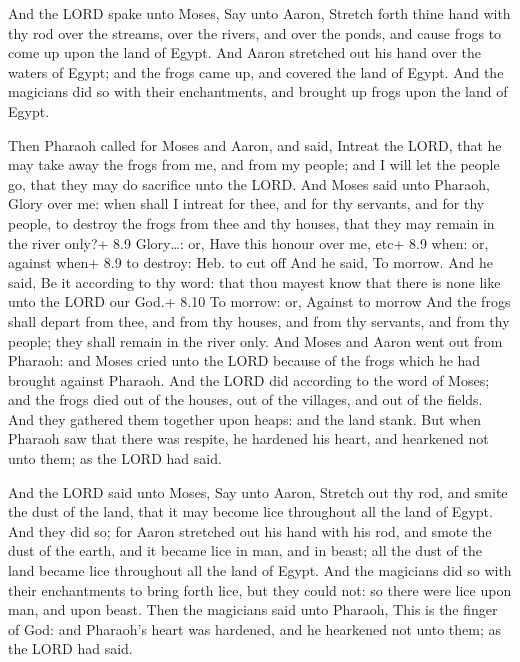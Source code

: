  And the LORD spake unto Moses, Say unto Aaron, Stretch
forth thine hand with thy rod over the streams, over the rivers, and
over the ponds, and cause frogs to come up upon the land of Egypt.
 And Aaron stretched out his hand over the waters of Egypt;
and the frogs came up, and covered the land of Egypt.  And
the magicians did so with their enchantments, and brought up frogs upon
the land of Egypt.

 Then Pharaoh called for Moses and Aaron, and said,
Intreat the LORD, that he may take away the frogs from me, and from my
people; and I will let the people go, that they may do sacrifice unto
the LORD.  And Moses said unto Pharaoh, Glory over me: when
shall I intreat for thee, and for thy servants, and for thy people, to
destroy the frogs from thee and thy houses, that they may remain in the
river only?+ 8.9 Glory\ldots: or, Have this honour over me, etc+ 8.9
when: or, against when+ 8.9 to destroy: Heb. to cut off 
And he said, To morrow. And he said, Be it according to thy word: that
thou mayest know that there is none like unto the LORD our God.+ 8.10 To
morrow: or, Against to morrow  And the frogs shall depart
from thee, and from thy houses, and from thy servants, and from thy
people; they shall remain in the river only.  And Moses and
Aaron went out from Pharaoh: and Moses cried unto the LORD because of
the frogs which he had brought against Pharaoh.  And the
LORD did according to the word of Moses; and the frogs died out of the
houses, out of the villages, and out of the fields.  And
they gathered them together upon heaps: and the land stank.
 But when Pharaoh saw that there was respite, he hardened
his heart, and hearkened not unto them; as the LORD had said.

 And the LORD said unto Moses, Say unto Aaron, Stretch
out thy rod, and smite the dust of the land, that it may become lice
throughout all the land of Egypt.  And they did so; for
Aaron stretched out his hand with his rod, and smote the dust of the
earth, and it became lice in man, and in beast; all the dust of the land
became lice throughout all the land of Egypt.  And the
magicians did so with their enchantments to bring forth lice, but they
could not: so there were lice upon man, and upon beast. 
Then the magicians said unto Pharaoh, This is the finger of God: and
Pharaoh's heart was hardened, and he hearkened not unto them; as the
LORD had said.

